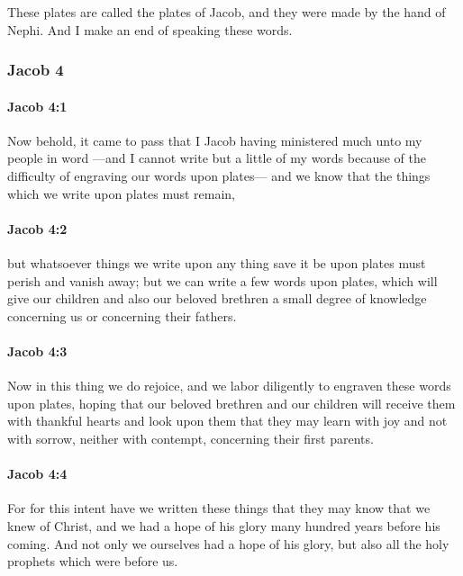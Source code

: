 			These plates are called the plates of Jacob,
			and they were made by the hand of Nephi.
			And I make an end of speaking these words.

	\subsubsection{Jacob 4} %
		\label{JACOB-4}
		
		\paragraph{Jacob 4:1} %
			\label{JACOB-4-1}

			Now behold, it came to pass that
			I Jacob having ministered much unto my people in word
			---and I cannot write but a little of my words
			because of the difficulty of engraving our words upon plates---
			and we know that the things which we write upon plates must remain,

		\paragraph{Jacob 4:2} %
			\label{JACOB-4-2}

			but whatsoever things we write upon any thing save it be upon plates
			must perish and vanish away;
			but we can write a few words upon plates,
			which will give our children and also our beloved brethren
			a small degree of knowledge concerning us or concerning their fathers.

		\paragraph{Jacob 4:3} %
			\label{JACOB-4-3}

			Now in this thing we do rejoice,
			and we labor diligently to engraven these words upon plates,
			hoping that our beloved brethren and our children
			will receive them with thankful hearts
			and look upon them that they may learn with joy
			and not with sorrow, neither with contempt,
			concerning their first parents.

		\paragraph{Jacob 4:4} %
			\label{JACOB-4-4}

			For for this intent have we written these things
			that they may know that we knew of Christ,
			and we had a hope of his glory many hundred years before his coming.
			And not only we ourselves had a hope of his glory,
			but also all the holy prophets which were before us.

